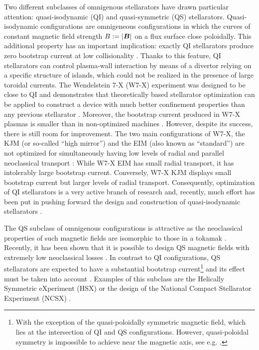 Two different subclasses of omnigenous stellarators have drawn particular attention: quasi-isodynamic (QI) and quasi-symmetric (QS) stellarators. Quasi-isodynamic configurations are omnigeneous configurations in which the curves of constant magnetic field strength $B:=|\vb*{B}|$ on a flux surface close poloidally. This additional property has an important implication: exactly QI stellarators produce zero bootstrap current at low collisionality \cite{Helander_2009,Helander_2011_Bootstrap}. Thanks to this feature, QI stellarators can control plasma-wall interaction by means of a divertor relying on a specific structure of islands, which could not be realized in the presence of large toroidal currents. The Wendelstein 7-X (W7-X) experiment was designed to be close to QI and demonstrates that theoretically based stellarator optimization can be applied to construct a device with much better confinement properties than any previous stellarator \cite{Beidler2021}. Moreover, the bootstrap current produced in W7-X plasmas is smaller than in non-optimized machines \cite{Dinklage2018}. However, despite its success, there is still room for improvement. The two main configurations of W7-X, the KJM (or so-called ``high mirror'') and the EIM (also known as ``standard'') are not optimized for simultaneously having low levels of radial and parallel neoclassical transport \cite{Beidler_2011, Beidler2021}: While W7-X EIM has small radial transport, it has intolerably large bootstrap current. Conversely, W7-X KJM displays small bootstrap current but larger levels of radial transport. Consequently, optimization of QI stellarators is a very active branch of research and, recently, much effort has been put in pushing forward the design and construction of quasi-isodynamic stellarators \cite{Sanchez_2023,velasco2023robust,RJorge_2022,camachomata_plunk_jorge_2022,goodman2022constructing}.

The QS subclass of omnigenous configurations is attractive as the neoclassical properties of such magnetic fields are isomorphic to those in a tokamak \cite{Pytte_Isomorphic,Boozer_Isomorphic}. Recently, it has been shown that it is possible to design QS magnetic fields with extremely low neoclassical losses \cite{Landreman_PreciseQS}. In contrast to QI configurations, QS stellarators are expected to have a substantial bootstrap current\footnote{With the exception of the quasi-poloidally symmetric magnetic field, which lies at the intersection of QI and QS configurations. However, quasi-poloidal symmetry is impossible to achieve near the magnetic axis, see e.g. \cite{Helander_2014}.} and its effect must be taken into account \cite{Landreman_SelfConsistent}. Examples of this subclass are the Helically Symmetric eXperiment (HSX) \cite{HSX} or the design of the National Compact Stellarator Experiment (NCSX) \cite{NCSX}. 

